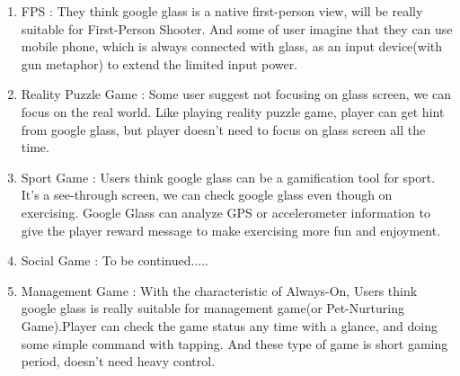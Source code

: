  

\begin{enumerate}
\item FPS : They think google glass is a native first-person view, will be really suitable for First-Person Shooter. And some of user imagine that they can use mobile phone, which is always connected with glass, as an input device(with gun metaphor) to extend the limited input power.

\item Reality Puzzle Game : Some user suggest not focusing on glass screen, we can focus on the real world. Like playing reality puzzle game, player can get hint from google glass, but player doesn't need to focus on glass screen all the time. 

\item Sport Game : Users think google glass can be a gamification tool for sport. It's a see-through screen, we can check google glass even though on exercising. Google Glass can analyze GPS or accelerometer information to give the player reward message to make exercising more fun and enjoyment.

\item Social Game : To be continued.....

\item Management Game : With the characteristic of Always-On, Users think google glass is really suitable for management game(or Pet-Nurturing Game).Player can check the game status any time with a glance, and doing some simple command with tapping. And these type of game is short gaming period, doesn't need heavy control.

\end{enumerate}



